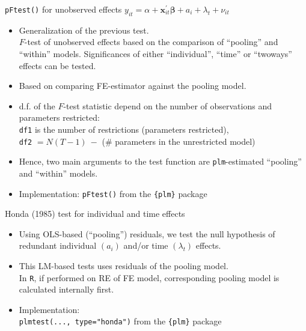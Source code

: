 \documentclass[usenames,dvipsnames]{beamer}
\begin{document}
\begin{frame}{\texttt{pFtest()} for unobserved effects}
\small 
$y_{it} = \alpha + \bm{x}^{\prime}_{it} \bm{\beta} + a_i + \lambda_t + \nu_{it}$\\ \medskip
\begin{itemize}
    \item Generalization of the previous test. \\ \medskip $F$-test of unobserved effects based on the comparison of ``pooling'' and ``within'' models. Significances of either ``individual'', ``time'' or ``twoways'' effects can be tested.
    \medskip
    \item  Based on comparing FE-estimator against the pooling model. 
    \medskip 
    \item d.f. of the $F$-test statistic depend on the number of observations and parameters restricted:\\
    \texttt{df1} is the number of restrictions (parameters restricted), \\
    \texttt{df2} $= N(T-1)~-$ (\# parameters in the unrestricted model)
    \medskip
    \item Hence, two main arguments to the test function are \texttt{plm}-estimated ``pooling'' and ``within'' models. 
    \medskip
    \item Implementation: \texttt{pFtest()} from the \texttt{\{plm\}} package
\end{itemize}    
\end{frame}
\begin{frame}{Honda (1985) test for individual and time effects}
\begin{itemize}
    \item Using OLS-based (``pooling'') residuals, we test the null hypothesis of redundant individual $(a_i)$ and/or time $ (\lambda_t) $ effects.
    \bigskip
    \item This LM-based tests uses residuals of the pooling model. \\In \texttt{R}, if performed on RE of FE model, corresponding pooling model is calculated internally first. 
    \bigskip
    \item Implementation: \\ \medskip \texttt{plmtest(..., type="honda")} from the \texttt{\{plm\}} package
\end{itemize}
\end{frame}
\end{document}
